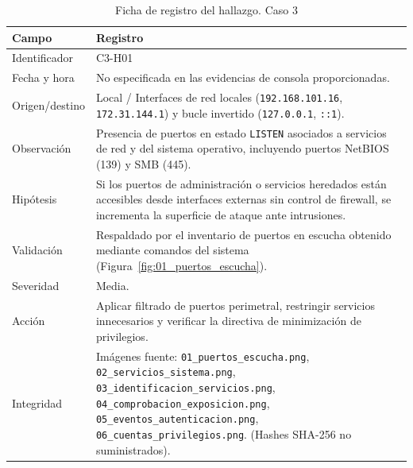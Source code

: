 \begin{table}[H]
\centering
\caption{Ficha de registro del hallazgo. Caso 3}
\label{tab:ficha_hallazgo_c3}
\begin{tabular}{|p{4cm}|p{10cm}|}
\hline
\textbf{Campo} & \textbf{Registro} \\
\hline
Identificador & C3-H01 \\
\hline
Fecha y hora & No especificada en las evidencias de consola proporcionadas. \\
\hline
Origen/destino & Local / Interfaces de red locales (\texttt{192.168.101.16}, \texttt{172.31.144.1}) y bucle invertido (\texttt{127.0.0.1}, \texttt{::1}). \\
\hline
Observación & Presencia de puertos en estado \texttt{LISTEN} asociados a servicios de red y del sistema operativo, incluyendo puertos NetBIOS (139) y SMB (445). \\
\hline
Hipótesis & Si los puertos de administración o servicios heredados están accesibles desde interfaces externas sin control de firewall, se incrementa la superficie de ataque ante intrusiones. \\
\hline
Validación & Respaldado por el inventario de puertos en escucha obtenido mediante comandos del sistema (Figura~\ref{fig:01_puertos_escucha}). \\
\hline
Severidad & Media. \\
\hline
Acción & Aplicar filtrado de puertos perimetral, restringir servicios innecesarios y verificar la directiva de minimización de privilegios. \\
\hline
Integridad & Imágenes fuente: \texttt{01\_puertos\_escucha.png}, \texttt{02\_servicios\_sistema.png}, \texttt{03\_identificacion\_servicios.png}, \texttt{04\_comprobacion\_exposicion.png}, \texttt{05\_eventos\_autenticacion.png}, \texttt{06\_cuentas\_privilegios.png}. (Hashes SHA-256 no suministrados). \\
\hline
\end{tabular}
\end{table}
